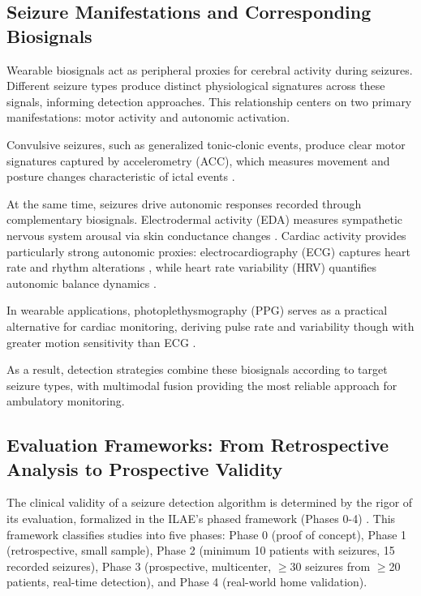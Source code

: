\subsection{Seizure Manifestations and Corresponding Biosignals}

Wearable biosignals act as peripheral proxies for cerebral activity during seizures. 
Different seizure types produce distinct physiological signatures across these signals, 
informing detection approaches. This relationship centers on two primary manifestations: 
motor activity and autonomic activation.

Convulsive seizures, such as generalized tonic-clonic events, 
produce clear motor signatures captured by accelerometry (ACC), 
which measures movement and posture changes characteristic of ictal events 
\parencite{wangEpilepticSeizureDetection2025, wuNovelSeizureDetection2024}.

At the same time, seizures drive autonomic responses recorded through complementary biosignals. 
Electrodermal activity (EDA) measures sympathetic nervous system arousal via skin conductance changes 
\parencite{jainCompressedSensingBased2017, mironAutonomicBiosignalsSeizure2025}. 
Cardiac activity provides particularly strong autonomic proxies: electrocardiography (ECG) 
captures heart rate and rhythm alterations 
\parencite{lealViabilityECGFeatures2017, ghaderiAdvancesMachineLearning2025}, 
while heart rate variability (HRV) quantifies autonomic balance dynamics 
\parencite{masonHeartRateVariability2024, paveiEarlySeizureDetection2017}.

In wearable applications, photoplethysmography (PPG) serves 
as a practical alternative for cardiac monitoring,
deriving pulse rate and variability though with greater motion sensitivity than ECG 
\parencite{chenSeizuresDetectionUsing2022, sethFeasibilityCardiacbasedSeizure2023}.

As a result, detection strategies combine these biosignals according to target seizure types, 
with multimodal fusion providing the most reliable approach for ambulatory monitoring.

\subsection{Evaluation Frameworks: From Retrospective Analysis to Prospective Validity}
\label{sec:ilae-standards}

The clinical validity of a seizure detection algorithm is determined by the rigor of
its evaluation, formalized in the ILAE's phased framework (Phases 0-4)
\parencite{beniczkyStandardsTestingClinical2018, beniczkyAutomatedSeizureDetection2021}.
This framework classifies studies into five phases: Phase 0 (proof of concept), Phase 1 (retrospective, small sample), Phase 2 (minimum 10 patients with seizures, 15 recorded seizures), Phase 3 (prospective, multicenter, $\ge$30 seizures from $\ge$20 patients, real-time detection), and Phase 4 (real-world home validation).

